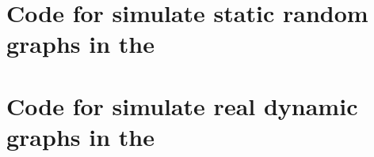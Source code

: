  \appendix
\chapter{Code for simulate static random graphs in the \DPmst\ \label{appendix:dp_sim:rand}}

\resizebox{\textwidth}{!}{
    
}

\chapter{Code for simulate real dynamic graphs in the \DPmst\ \label{appendix:dp_sim:real}}

\resizebox{\textwidth}{!}{
    
}